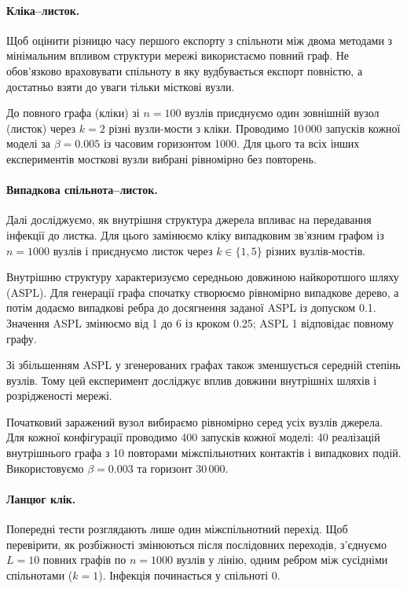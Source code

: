 \paragraph{Кліка--листок.}
Щоб оцінити різницю часу першого експорту з спільноти між двома методами з мінімальним впливом структури мережі використаємо повний граф. Не обов'язково враховувати спільноту в яку вудбувається експорт повністю, а достатньо взяти до уваги тільки місткові вузли.

До повного графа (кліки) зі $n=100$ вузлів приєднуємо
один зовнішній вузол (листок) через $k=2$
різні вузли-мости з кліки.  Проводимо 10\,000 запусків кожної моделі
за $\beta=0.005$ із часовим горизонтом 1000. Для цього та всіх інших експериментів мосткові вузли вибрані рівномірно
без повторень.

\paragraph{Випадкова спільнота--листок.}
Далі досліджуємо, як внутрішня структура
джерела впливає на передавання інфекції
до листка. Для цього замінюємо кліку
випадковим зв'язним графом із $n=1000$
вузлів і приєднуємо листок через
$k\in\{1,5\}$ різних вузлів-мостів.

Внутрішню структуру характеризуємо
середньою довжиною найкоротшого шляху (ASPL).
Для генерації графа спочатку створюємо
рівномірно випадкове дерево, а потім додаємо
випадкові ребра до досягнення заданої ASPL
із допуском 0.1. Значення ASPL змінюємо
від 1 до 6 із кроком 0.25;
ASPL 1 відповідає повному графу.

Зі збільшенням ASPL у згенерованих графах
також зменшується середній степінь вузлів.
Тому цей експеримент досліджує 
вплив довжини внутрішніх шляхів
і розрідженості мережі.


Початковий заражений вузол вибираємо
рівномірно серед усіх вузлів джерела.
Для кожної конфігурації проводимо
400 запусків кожної моделі:
40 реалізацій внутрішнього графа
з 10 повторами міжспільнотних контактів
і випадкових подій.
Використовуємо $\beta=0.003$
та горизонт 30\,000.




\paragraph{Ланцюг клік.}
Попередні тести розглядають лише один
міжспільнотний перехід. Щоб перевірити,
як розбіжності змінюються після
послідовних переходів, з'єднуємо
$L=10$ повних графів по $n=1000$ вузлів
у лінію, одним ребром між сусідніми
спільнотами ($k=1$).
Інфекція починається у спільноті 0.

